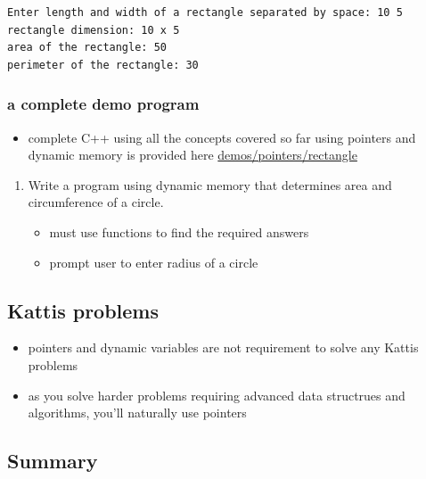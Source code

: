\documentclass[11pt]{article}
\providecommand{\tightlist}{%
      \setlength{\itemsep}{0pt}\setlength{\parskip}{0pt}}
\begin{document}
    \begin{Verbatim}[commandchars=\\\{\}]
Enter length and width of a rectangle separated by space: 10 5
rectangle dimension: 10 x 5
area of the rectangle: 50
perimeter of the rectangle: 30
    \end{Verbatim}

    \hypertarget{a-complete-demo-program}{%
\subsubsection{a complete demo program}\label{a-complete-demo-program}}

\begin{itemize}
\tightlist
\item
  complete C++ using all the concepts covered so far using pointers and
  dynamic memory is provided here \url{demos/pointers/rectangle}
\end{itemize}

    \begin{enumerate}
\def\labelenumi{\arabic{enumi}.}
\setcounter{enumi}{1}
\tightlist
\item
  Write a program using dynamic memory that determines area and
  circumference of a circle.

  \begin{itemize}
  \tightlist
  \item
    must use functions to find the required answers
  \item
    prompt user to enter radius of a circle
  \end{itemize}
\end{enumerate}

\hypertarget{kattis-problems}{%
\subsection{Kattis problems}\label{kattis-problems}}

\begin{itemize}
\tightlist
\item
  pointers and dynamic variables are not requirement to solve any Kattis
  problems
\item
  as you solve harder problems requiring advanced data structrues and
  algorithms, you'll naturally use pointers
\end{itemize}

    \hypertarget{summary}{%
\subsection{Summary}\label{summary}}
\end{document}
